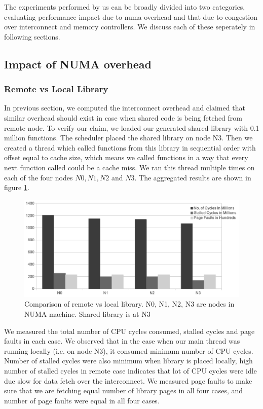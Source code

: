 
The experiments performed by us can be broadly divided into two categories, evaluating performance
impact due to numa overhead and that due to congestion over interconnect and memory controllers.
We discuss each of these seperately in following sections.
\subsection{Impact of NUMA overhead}

\subsubsection{Remote vs Local Library} \label{sec:remoteVsLocal}
In previous section, we computed the interconnect overhead and claimed that similar overhead should 
exist in case when shared code is being fetched from remote node.
To verify our claim, we loaded our generated shared library with 0.1 million functions.
The scheduler placed the shared library on node N3.
Then we created a thread which called functions from this library in sequential order with offset equal to cache size, 
which means we called functions in a way that every next function called could be a cache miss.
We ran this thread multiple times on each of the four nodes $N0, N1, N2$ and $N3$.
The aggregated results are shown in figure \ref{fig:remoteVsLocal}.

\begin{figure}
    \centering
    \includegraphics[scale=0.38]{remoteVsLocal.png}
    \caption{Comparison of remote vs local library. N0, N1, N2, N3 are nodes in NUMA machine. Shared library is at N3 }
    \label{fig:remoteVsLocal}
\end{figure}

We measured the total number of CPU cycles consumed, stalled cycles and page faults in each case.
We observed that in the case when our main thread was running locally (i.e. on node N3), it consumed minimum number of CPU cycles.
Number of stalled cycles were also minimum when library is placed locally, high number of stalled cycles in remote case indicates
that lot of CPU cycles were idle due slow for data fetch over the interconnect.
We measured page faults to make sure that we are fetching equal number of library pages in all four cases, 
and number of page faults were equal in all four cases.

